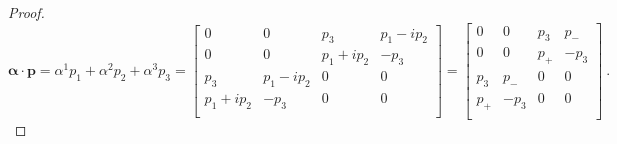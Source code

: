 \begin{proof}
\begin{equation*}
            \boldsymbol \alpha \cdot \mathbf p = \alpha^1 p_1 + \alpha^2 p_2 + \alpha^3 p_3 = \begin{bmatrix}
            0 & 0 & p_3 & p_1 - i p_2 \\
            0 & 0 & p_1 + i p_2 & - p_3 \\
            p_3 & p_1 - i p_2 & 0 & 0 \\
            p_1 + i p_2& -p_3 & 0 & 0 \\
            \end{bmatrix} = \begin{bmatrix}
                0 & 0 & p_3 & p_- \\
                0 & 0 & p_+ & - p_3 \\
                p_3 & p_- & 0 & 0 \\
                p_+ & -p_3 & 0 & 0 \\
            \end{bmatrix} ~.
        \end{equation*}
    

\end{proof}
